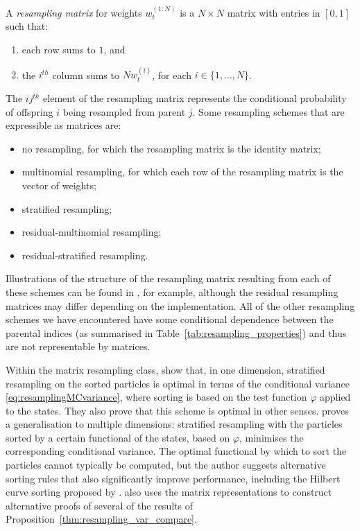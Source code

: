 \begin{defn}
A \emph{resampling matrix} for weights $w_t^{(1:N)}$ is a $N\times N$ matrix with entries in $[0,1]$ such that:
\begin{enumerate}
\item each row sums to $1$, and
\item the $i^{th}$ column sums to $Nw_t^{(i)}$, for each $i \in \{1,\dots,N\}$.
\end{enumerate}
\end{defn}
The $ij^{th}$ element of the resampling matrix represents the conditional probability of offspring $i$ being resampled from parent $j$.
Some resampling schemes that are expressible as matrices are:
\begin{itemize}
\item no resampling, for which the resampling matrix is the identity matrix;
\item multinomial resampling, for which each row of the resampling matrix is the vector of weights;
\item stratified resampling;
\item residual-multinomial resampling;
\item residual-stratified resampling.
\end{itemize}
Illustrations of the structure of the resampling matrix resulting from each of these schemes can be found in \textcite[Figure 2]{li2020}, for example, although the residual resampling matrices may differ depending on the implementation.
All of the other resampling schemes we have encountered have some conditional dependence between the parental indices (as summarised in Table~\ref{tab:resampling_properties}) and thus are not representable by matrices.

Within the matrix resampling class, \textcite{li2020} show that, in one dimension, stratified resampling on the sorted particles is optimal in terms of the conditional variance \eqref{eq:resamplingMCvariance}, where sorting is based on the test function $\varphi$ applied to the states. They also prove that this scheme is optimal in other senses.
\textcite{webber2019} proves a generalisation to multiple dimensions: stratified resampling with the particles sorted by a certain functional of the states, based on $\varphi$, minimises the corresponding conditional variance.
The optimal functional by which to sort the particles cannot typically be computed, but the author suggests alternative sorting rules that also significantly improve performance, including the Hilbert curve sorting proposed by \textcite{gerber2017}.
\textcite{webber2019} also uses the matrix representations to construct alternative proofs of several of the results of Proposition~\ref{thm:resampling_var_compare}.

